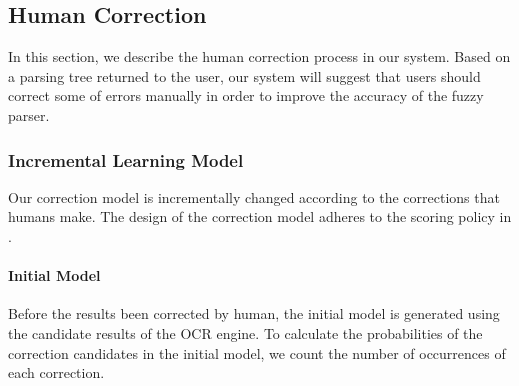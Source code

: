 \subsection{Human Correction}
\label{sec:correction}
In this section, we describe the human correction process in our system. 
Based on a parsing tree returned to the user, 
our system will suggest that users should correct some of errors manually in order to improve the accuracy of the fuzzy parser. 

\subsubsection{Incremental Learning Model}
\label{sec:incremental}
Our correction model is incrementally changed according to the corrections that 
humans make. The design of the correction model adheres to the scoring
policy in .
\paragraph{Initial Model}
Before the results been corrected by human, 
the initial model is generated using the candidate results of the OCR 
engine. 
To calculate the probabilities of the correction candidates in the initial 
model, we count the number of occurrences of each correction. 
